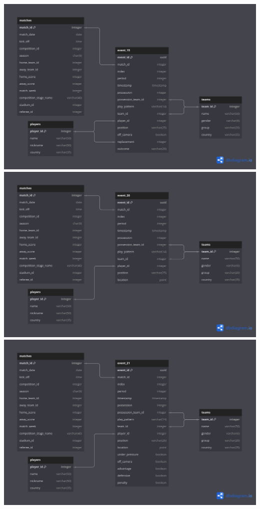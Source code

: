 \documentclass[12pt]{article}
\begin{document}
\includegraphics[width=\textwidth]{schema-diagram/event_19.png}
\includegraphics[width=\textwidth]{schema-diagram/event_20.png}
\includegraphics[width=\textwidth]{schema-diagram/event_21.png}
\end{document}
